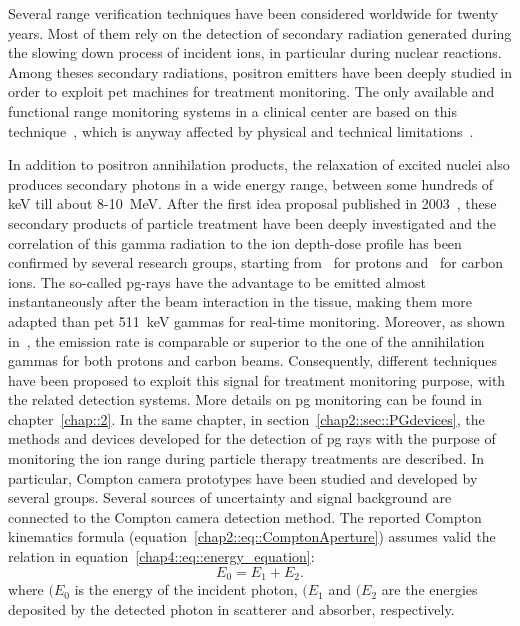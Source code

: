 Several range verification techniques have been considered worldwide for twenty years. Most of them rely on the detection of secondary radiation generated during the slowing down process of incident ions, in particular during nuclear reactions. Among theses secondary radiations, positron emitters have been deeply studied in order to exploit \gls{pet} machines for treatment monitoring. The only available and functional range monitoring systems in a clinical center are based on this technique~\parencite{Enghardt2004, Yamaya2018}, which is anyway affected by physical and technical limitations~\parencite{Parodi2015}.

In addition to positron annihilation products, the relaxation of excited nuclei also produces secondary photons in a wide energy range, between some hundreds of keV till about 8-10~MeV. After the first idea proposal published in 2003~\parencite{Stichelbaut2003}, these secondary products of particle treatment have been deeply investigated and the correlation of this gamma radiation to the ion depth-dose profile has been confirmed by several research groups, starting from~\cite{Min2006} for protons and~\cite{Testa2008} for carbon ions. The so-called \gls{pg}-rays have the advantage to be emitted almost instantaneously after the beam interaction in the tissue, making them more adapted than \gls{pet} 511~keV gammas for real-time monitoring. Moreover, as shown in~\parencite{Robert2013}, the emission rate is comparable or superior to the one of the annihilation gammas for both protons and carbon beams. Consequently, different techniques have been proposed to exploit this signal for treatment monitoring purpose, with the related detection systems. More details on \gls{pg} monitoring can be found in chapter~\ref{chap::2}.
In the same chapter, in section~\ref{chap2::sec::PGdevices}, the methods and devices developed for the detection of \gls{pg} rays with the purpose of monitoring the ion range during particle therapy treatments are described. In particular, Compton camera prototypes have been studied and developed by several groups.
Several sources of uncertainty and signal background are connected to the Compton camera detection method. The reported Compton kinematics formula (equation~\ref{chap2::eq::ComptonAperture}) assumes valid the relation in equation~\ref{chap4::eq::energy_equation}:
 \begin{equation}
E_{0} = E_{1}+E_{2}.
\label{chap4::eq::energy_equation}
\end{equation} 
where $(E_{0}$ is the energy of the incident photon,  $(E_{1}$ and $(E_{2}$ are the energies deposited by the detected photon in scatterer and absorber, respectively.
